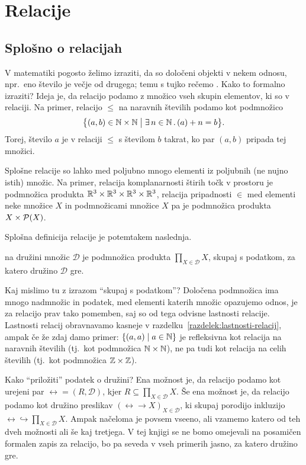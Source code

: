 \chapter{Relacije}\label{poglavje:relacije}

        \section{Splošno o relacijah}

                V matematiki pogosto želimo izraziti, da so določeni objekti v nekem odnosu, npr.~eno število je večje od drugega; temu s tujko rečemo . Kako to formalno izraziti? Ideja je, da relacijo podamo z množico vseh skupin elementov, ki so v relaciji. Na primer, relacijo $\leq$ na naravnih številih podamo kot podmnožico
                \[\set[1]{(a, b) \in \NN \times \NN}{\some{n \in \NN} a + n = b}.\]
                Torej, število $a$ je v relaciji $\leq$ s številom $b$ takrat, ko par $(a, b)$ pripada tej množici.

                Splošne relacije so lahko med poljubno mnogo elementi iz poljubnih (ne nujno istih) množic. Na primer, relacija komplanarnosti štirih točk v prostoru je podmnožica produkta $\mathbb{R}^3 \times \mathbb{R}^3 \times \mathbb{R}^3 \times \mathbb{R}^3$, relacija pripadnosti $\in$ med elementi neke množice $X$ in podmnožicami množice $X$ pa je podmnožica produkta $X \times \mathcal{P}(X)$.

                Splošna definicija relacije je potemtakem naslednja.
                \begin{definicija}
                         na družini množic $\mathscr{D}$ je podmnožica produkta $\prod_{X \in \mathscr{D}} X$, skupaj s podatkom, za katero družino $\mathscr{D}$ gre.
                \end{definicija}

                \begin{opomba}\label{opomba:definicija-relacij}
                        Kaj mislimo tu z izrazom ``skupaj s podatkom''? Določena podmnožica ima mnogo nadmnožic in podatek, med elementi katerih množic opazujemo odnos, je za relacijo prav tako pomemben, saj so od tega odvisne lastnosti relacije. Lastnosti relacij obravnavamo kasneje v razdelku~\ref{razdelek:lastnosti-relacij}, ampak če že zdaj damo primer: $\set{(a, a)}{a \in \NN}$ je refleksivna kot relacija na naravnih številih (tj.~kot podmnožica $\mathbb{N} \times \mathbb{N}$), ne pa tudi kot relacija na celih številih (tj.~kot podmnožica $\mathbb{Z} \times \mathbb{Z}$).

                        Kako ``priložiti'' podatek o družini? Ena možnost je, da relacijo podamo kot urejeni par $\rel = (R, \mathscr{D})$, kjer $R \subseteq \prod_{X \in \mathscr{D}} X$. Še ena možnost je, da relacijo podamo kot družino preslikav $(\rel \to X)_{X \in \mathscr{D}}$, ki skupaj porodijo inkluzijo $\rel \hookrightarrow \prod_{X \in \mathscr{D}} X$. Ampak načeloma je povsem vseeno, ali vzamemo katero od teh dveh možnosti ali še kaj tretjega. V tej knjigi se ne bomo omejevali na posamičen formalen zapis za relacijo, bo pa seveda v vseh primerih jasno, za katero družino gre.
                \end{opomba}

